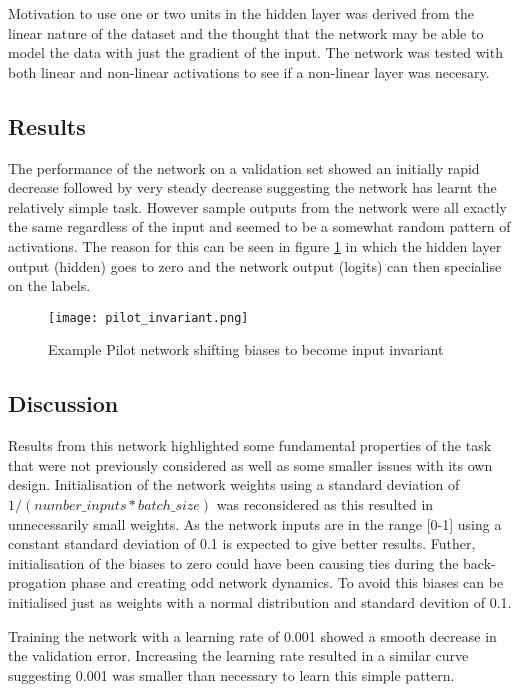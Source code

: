 Motivation to use one or two units in the hidden layer was derived from the linear nature of the dataset and the thought that the network may be able to model the data with just the gradient of the input.
The network was tested with both linear and non-linear activations to see if a non-linear layer was necesary.

\subsection{Results}
The performance of the network on a validation set showed an initially rapid decrease followed by very steady decrease suggesting the network has learnt the relatively simple task.
However sample outputs from the network were all exactly the same regardless of the input and seemed to be a somewhat random pattern of activations.
The reason for this can be seen in figure \ref{fig:pilotInvariance} in which the hidden layer output (hidden) goes to zero and the network output (logits) can then specialise on the labels.

\begin{figure}[h]
    \centering
    \texttt{[image: pilot\_invariant.png]}
    \caption{Example Pilot network shifting biases to become input invariant}
    \label{fig:pilotInvariance}
\end{figure}



\subsection{Discussion}
Results from this network highlighted some fundamental properties of the task that were not previously considered as well as some smaller issues with its own design.
Initialisation of the network weights using a standard deviation of $1 / ( number\_inputs * batch\_size )$ was reconsidered as this resulted in unnecessarily small weights. 
As the network inputs are in the range [0-1] using a constant standard deviation of 0.1 is expected to give better results. 
Futher, initialisation of the biases to zero could have been causing ties during the back-progation phase and creating odd network dynamics.
To avoid this biases can be initialised just as weights with a normal distribution and standard devition of 0.1.

Training the network with a learning rate of 0.001 showed a smooth decrease in the validation error. 
Increasing the learning rate resulted in a similar curve suggesting 0.001 was smaller than necessary to learn this simple pattern. 

